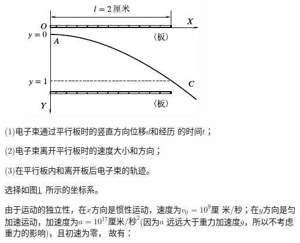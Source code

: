 \begin{figure}
 \centering
 \includegraphics{figure/fig01.15}
 \caption{}
 \label{fig:01.15}
\end{figure}
(1)电子束通过平行板时的竖直方向位移$d$和经历
的时间$t$；

(2)电子束离开平行板时的速度大小和方向；

(3)在平行板内和离开板后电子束的轨迹。

\solution 选择如图\ref{fig:01.15}~所示的坐标系。

由于运动的独立性，在$x$方向是惯性运动，速度为$v_0=10^9$厘
米/秒；在$y$方向是匀加速运动，加速度为$a=10^{17}\text{厘米/秒}^2$(因为$a$
远远大于重力加速度$g$，所以不考虑重力的影响)，且初速为零，
故有：

